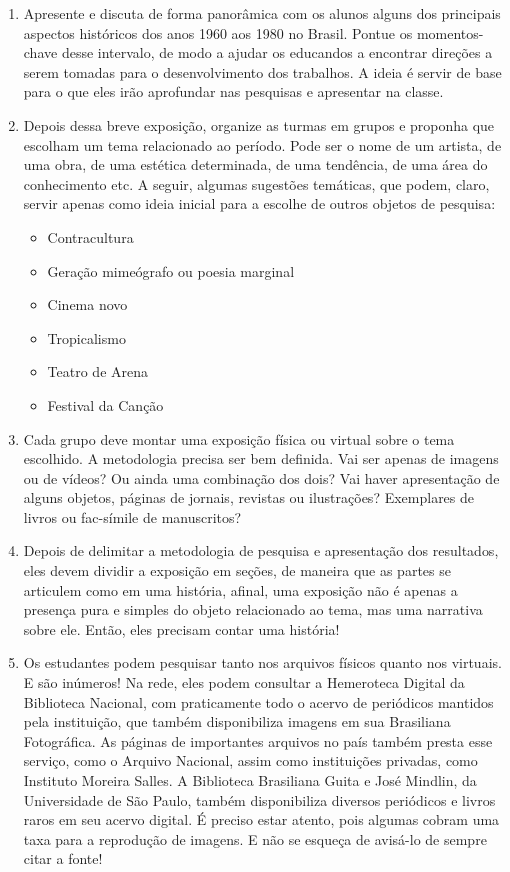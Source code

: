 \documentclass[12pt]{extarticle}
\begin{document}
\begin{enumerate} 
\item Apresente e discuta de forma panorâmica com os
alunos alguns dos principais aspectos históricos dos anos 1960 aos 1980
no Brasil. Pontue os momentos-chave desse intervalo, de modo a ajudar os
educandos a encontrar direções a serem tomadas para o desenvolvimento
dos trabalhos. A ideia é servir de base para o que eles irão aprofundar
nas pesquisas e apresentar na classe.

\item Depois dessa breve exposição, organize as turmas em grupos e proponha
que escolham um tema relacionado ao período. Pode ser o nome de um
artista, de uma obra, de uma estética determinada, de uma tendência, de
uma área do conhecimento etc. A seguir, algumas sugestões temáticas, que
podem, claro, servir apenas como ideia inicial para a escolhe de outros
objetos de pesquisa:

\begin{itemize}
\item
  Contracultura
\item
  Geração mimeógrafo ou poesia marginal
\item
  Cinema novo
\item
  Tropicalismo
\item
  Teatro de Arena
\item
  Festival da Canção
\end{itemize}

\item Cada grupo deve montar uma exposição física ou virtual sobre o tema
escolhido. A metodologia precisa ser bem definida. Vai ser apenas de
imagens ou de vídeos? Ou ainda uma combinação dos dois? Vai haver
apresentação de alguns objetos, páginas de jornais, revistas ou
ilustrações? Exemplares de livros ou fac-símile de manuscritos?

\item Depois de delimitar a metodologia de pesquisa e apresentação dos
resultados, eles devem dividir a exposição em seções, de maneira que as
partes se articulem como em uma história, afinal, uma exposição não é
apenas a presença pura e simples do objeto relacionado ao tema, mas uma
narrativa sobre ele. Então, eles precisam contar uma história!

\item Os estudantes podem pesquisar tanto nos arquivos físicos quanto nos
virtuais. E são inúmeros! Na rede, eles podem consultar a Hemeroteca
Digital da Biblioteca Nacional, com praticamente todo o acervo de
periódicos mantidos pela instituição, que também disponibiliza imagens
em sua Brasiliana Fotográfica. As páginas de importantes arquivos no
país também presta esse serviço, como o Arquivo Nacional, assim como
instituições privadas, como Instituto Moreira Salles. A Biblioteca
Brasiliana Guita e José Mindlin, da Universidade de São Paulo, também
disponibiliza diversos periódicos e livros raros em seu acervo digital.
É preciso estar atento, pois algumas cobram uma taxa para a reprodução
de imagens. E não se esqueça de avisá-lo de sempre citar a fonte!


\end{enumerate}
\end{document}
